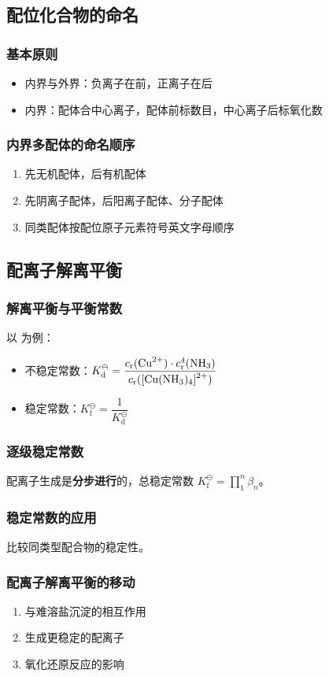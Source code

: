 \subsection{配位化合物的命名}
\subsubsection{基本原则}
\begin{itemize}
    \item 内界与外界：负离子在前，正离子在后
    \item 内界：配体合中心离子，配体前标数目，中心离子后标氧化数
\end{itemize}

\subsubsection{内界多配体的命名顺序}
\begin{enumerate}
    \item 先无机配体，后有机配体
    \item 先阴离子配体，后阳离子配体、分子配体
    \item 同类配体按配位原子元素符号英文字母顺序
\end{enumerate}

\subsection{配离子解离平衡}
\subsubsection{解离平衡与平衡常数}
以  为例：
\begin{itemize}
    \item 不稳定常数：$K_{\text{d}}^{\ominus} = \dfrac{c_{\text{r}}(\ce{Cu^{2+}}) \cdot c_{\text{r}}^4(\ce{NH3})}{c_{\text{r}}(\ce{[Cu(NH3)4]^{2+}})}$
    \item 稳定常数：$K_{\text{f}}^{\ominus} = \dfrac{1}{K_{\text{d}}^{\ominus}}$
\end{itemize}

\subsubsection{逐级稳定常数}
配离子生成是\textbf{分步进行}的，总稳定常数 $K_{\text{f}}^{\ominus} = \prod _1^n \beta_n$。

\subsubsection{稳定常数的应用}
比较同类型配合物的稳定性。

\subsubsection{配离子解离平衡的移动}
\begin{enumerate}
    \item 与难溶盐沉淀的相互作用
    \item 生成更稳定的配离子
    \item 氧化还原反应的影响
\end{enumerate}